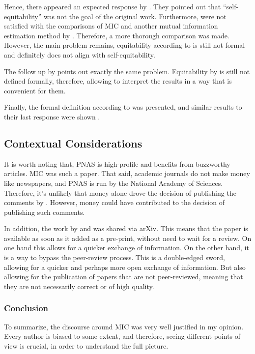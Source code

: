 \documentclass{article}
\begin{document}
\sloppy
Hence, there appeared an expected response by \cite{reshef2014}. They pointed out that ``self-equitability'' was not the goal of the original work. Furthermore, \cite{reshef2014} were not satisfied with the comparisons of MIC and another mutual information estimation method by \cite{kinney2014}. Therefore, a more thorough comparison was made. However, the main problem remains, equitability according to \cite{reshef2014} is still not formal and definitely does not align with self-equitability. 

The follow up by \cite{kinney20142} points out exactly the same problem. Equitability by \cite{reshef2014} is still not defined formally, therefore, allowing \cite{reshef2014} to interpret the results in a way that is convenient for them.

Finally, the formal definition according to \cite{reshef2015} was presented, and similar results to their last response were shown \citep{reshef2014}.

\subsection{Contextual Considerations}
It is worth noting that, PNAS is high-profile and benefits from buzzworthy articles. MIC was such a paper. That said, academic journals do not make money like newspapers, and PNAS is run by the National Academy of Sciences. Therefore, it's unlikely that money alone drove the decision of publishing the comments by \cite{kinney2014}. However, money could have contributed to the decision of publishing such comments.

In addition, the work by \cite{simon2014} and \cite{reshef2015} was shared via arXiv. This means that the paper is available as soon as it added as a pre-print, without need to wait for a review. On one hand this allows for a quicker exchange of information. On the other hand, it is a way to bypass the peer-review process. This is a double-edged sword, allowing for a quicker and perhaps more open exchange of information. But also allowing for the publication of papers that are not peer-reviewed, meaning that they are not necessarily correct or of high quality.


\subsubsection*{Conclusion}
To summarize, the discourse around MIC was very well justified in my opinion. Every author is biased to some extent, and therefore, seeing different points of view is crucial, in order to understand the full picture.
\end{document}
